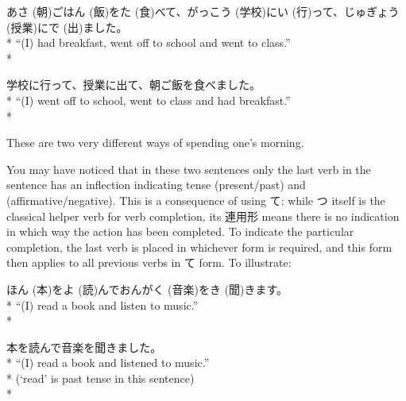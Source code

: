 \documentclass[11pt, b5paper, twoside, openright, onecolumn]{book}
\makeatletter
\newcommand*{\rubystack}[2]{{\relscale{0.5}%
  \begin{tabular}[b]{@{}c@{}}%
    {#1}\\%
   {\textscale{2}{#2}}%
  \end{tabular}}%
}
\DeclareRobustCommand*{\ruby}[2]{%
  \mbox{%
    \setlength{\parskip}{0ex}%
    \BeginAccSupp{method=pdfstringdef,ActualText={#1}}%
      \rubystack{\phantom{#2}}{#1}%
      \llap{%
        \rubystack{#2}{\phantom{#1}}%
      }%
    \EndAccSupp{}%
  }%
}
\renewcommand*{\ruby}[2]{#2 (#1)}%
\newenvironment{exampleblock}{
\setlength{\parindent}{0.6in}
\begin{minipage}[t]{\dimexpr\textwidth-\parindent}}
{\end{minipage}}
\makeatother
\begin{document}
\vspace{0.4cm}
\begin{exampleblock}
\ruby{朝}{あさ}ご\ruby{飯}{はん}を\ruby{食}{た}べて、\ruby{学校}{がっこう}に\ruby{行}{い}って、\ruby{授業}{じゅぎょう}に\ruby{出}{で}ました。 \\* 
“(I) had breakfast‚ went off to school and went to class.” \\* 
\end{exampleblock}
\vspace{0.2cm}

\begin{exampleblock}
学校に行って、授業に出て、朝ご飯を食べました。 \\* 
“(I) went off to school‚ went to class and had breakfast.” \\* 
\end{exampleblock}
\vspace{0.2cm}

These are two very different ways of spending one’s morning.

You may have noticed that in these two sentences only the last verb in the sentence has an inflection indicating tense (present/\linebreak[0]past) and  (affirmative/\linebreak[0]negative). This is a consequence of using て: while つ itself is the classical helper verb for verb completion‚ its 連用形 means there is no indication in which way the action has been completed. To indicate the particular completion‚ the last verb is placed in whichever form is required‚ and this form then applies to all previous verbs in て form. To illustrate:

\vspace{0.4cm}
\begin{exampleblock}
\ruby{本}{ほん}を\ruby{読}{よ}んで\ruby{音楽}{おんがく}を\ruby{聞}{き}きます。 \\* 
“(I) read a book and listen to music.” \\* 
\end{exampleblock}
\vspace{0.2cm}

\begin{exampleblock}
本を読んで音楽を聞きました。 \\* 
“(I) read a book and listened to music.” \\* 
(‘read’ is past tense in this sentence) \\* 
\end{exampleblock}
\end{document}
